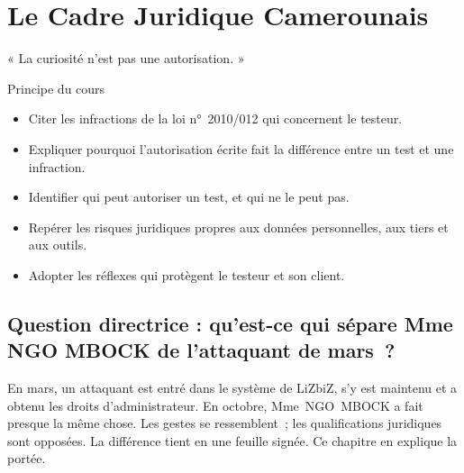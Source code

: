 
\chapter{Le Cadre Juridique Camerounais}
\label{chap:droit}

\epigraph{%
    « La curiosité n'est pas une autorisation. »%
}{Principe du cours}


\begin{boxobjectifs}
\begin{itemize}
    \item Citer les infractions de la loi n°~2010/012 qui concernent le
          testeur.
    \item Expliquer pourquoi l'autorisation écrite fait la différence entre
          un test et une infraction.
    \item Identifier qui peut autoriser un test, et qui ne le peut pas.
    \item Repérer les risques juridiques propres aux données personnelles,
          aux tiers et aux outils.
    \item Adopter les réflexes qui protègent le testeur et son client.
\end{itemize}
\end{boxobjectifs}

\bigskip

\section*{Question directrice : qu'est-ce qui sépare Mme NGO MBOCK de l'attaquant de mars~?}

En mars, un attaquant est entré dans le système de LiZbiZ, s'y est
maintenu et a obtenu les droits d'administrateur. En octobre, Mme~NGO~MBOCK
a fait presque la même chose. Les gestes se ressemblent~; les qualifications
juridiques sont opposées. La différence tient en une feuille signée. Ce
chapitre en explique la portée.

